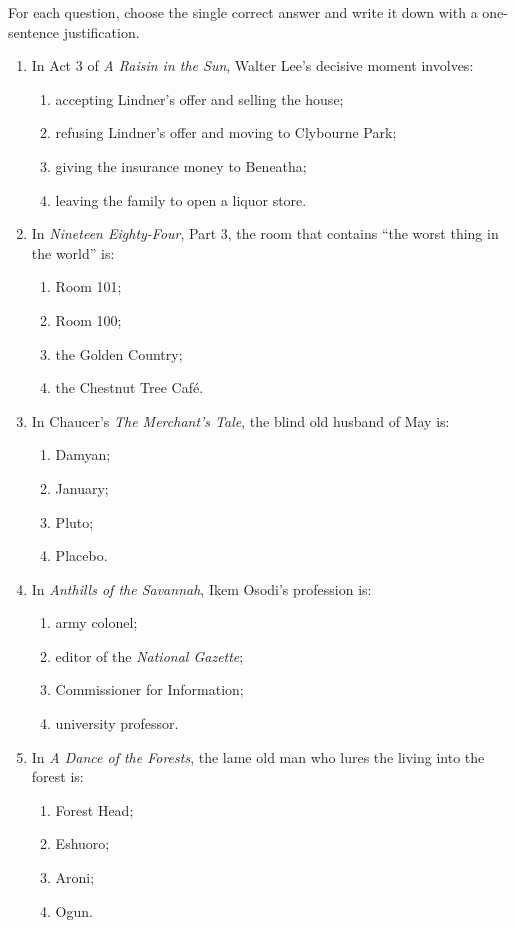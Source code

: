\documentclass[11pt]{article}
\begin{document}
\begin{exercice}
For each question, choose the single correct answer and write it down with a one-sentence justification.
\begin{enumerate}
\item In Act 3 of \emph{A Raisin in the Sun}, Walter Lee's decisive moment involves:
\begin{enumerate}
\item accepting Lindner's offer and selling the house;
\item refusing Lindner's offer and moving to Clybourne Park;
\item giving the insurance money to Beneatha;
\item leaving the family to open a liquor store.
\end{enumerate}
\item In \emph{Nineteen Eighty-Four}, Part 3, the room that contains ``the worst thing in the world'' is:
\begin{enumerate}
\item Room 101; \item Room 100; \item the Golden Country; \item the Chestnut Tree Caf\'e.
\end{enumerate}
\item In Chaucer's \emph{The Merchant's Tale}, the blind old husband of May is:
\begin{enumerate}
\item Damyan; \item January; \item Pluto; \item Placebo.
\end{enumerate}
\item In \emph{Anthills of the Savannah}, Ikem Osodi's profession is:
\begin{enumerate}
\item army colonel; \item editor of the \emph{National Gazette}; \item Commissioner for Information; \item university professor.
\end{enumerate}
\item In \emph{A Dance of the Forests}, the lame old man who lures the living into the forest is:
\begin{enumerate}
\item Forest Head; \item Eshuoro; \item Aroni; \item Ogun.
\end{enumerate}
\end{enumerate}
\end{exercice}
\end{document}
